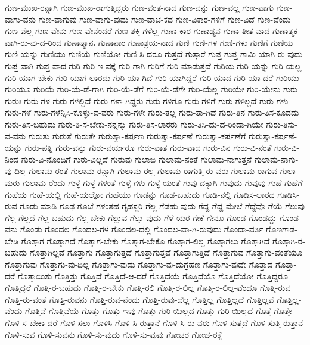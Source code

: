 {ಗುಣ-ಮುಖ-ರನ್ನಾಗಿ
ಗುಣ-ಮುಖ-ರಾಗುತ್ತಿದ್ದರು
ಗುಣ-ವಂತ-ನಾದ
ಗುಣ-ವನ್ನು
ಗುಣ-ವಲ್ಲ
ಗುಣ-ವಾಗು
ಗುಣ-ವಾಗು-ವನು
ಗುಣ-ವಾಗುವು
ಗುಣ-ವಾಗು-ವುದು
ಗುಣ-ವಾಚ-ಕದ
ಗುಣ-ವಿಕಾರ-ಗಳಿಗೆ
ಗುಣ-ವಿದೆ
ಗುಣ-ವೆಂದು
ಗುಣ-ವೆಲ್ಲ
ಗುಣ-ವೇನು
ಗುಣ-ವೇನೆಂದರೆ
ಗುಣ-ಶಕ್ತಿ-ಗಳೆಲ್ಲ
ಗುಣಾ-ಕಾರ
ಗುಣಾಢ್ಯನ
ಗುಣಾ-ತೀತ-ವಾದ
ಗುಣಾತ್ಮಕ-ವಾಗಿ-ರು-ವು-ದ-ರಿಂದ
ಗುಣಾತ್ಮಾನಃ
ಗುಣಾನಾಂ
ಗುಣಾಶ್ರಯ-ನಾದ
ಗುಣಿ
ಗುಣಿ-ಗಳ
ಗುಣಿ-ಗಳು
ಗುಣಿಗೆ
ಗುಣಿಯ
ಗುಣಿ-ಯನ್ನು
ಗುಣಿಯು
ಗುಣಿಯೆ
ಗುಣಿಯೋ
ಗುಣಿ-ಸಿ-ದರೂ
ಗುತ್ತದೆ
ಗುತ್ತಾರೆ
ಗುಪ್ತ
ಗುಪ್ತ-ಗಾಮಿ-ಯಾಗಿ-ರು-ವುದು
ಗುಪ್ತ-ವಾಗಿ
ಗುಪ್ತ-ವಾದ
ಗುರಿ
ಗುರಿ-ಇ-ವಕ್ಕೆ
ಗುರಿ-ಗಾಗಿ
ಗುರಿಗೆ
ಗುರಿ-ಮಾಡುತ್ತದೆ
ಗುರಿಯ
ಗುರಿ-ಯನ್ನು
ಗುರಿ-ಯಲ್ಲ
ಗುರಿ-ಯಾಗ-ಬೇಕು
ಗುರಿ-ಯಾಗ-ಲಾರದು
ಗುರಿ-ಯಾ-ಗಿದೆ
ಗುರಿ-ಯಾಗಿದ್ದರೆ
ಗುರಿ-ಯಾದ
ಗುರಿ-ಯಾ-ದರೆ
ಗುರಿಯು
ಗುರಿಯೂ
ಗುರಿಯೆ
ಗುರಿ-ಯೆ-ಡೆ-ಗಾಗಿ
ಗುರಿ-ಯೆ-ಡೆಗೆ
ಗುರಿ-ಯೆ-ಡೆಗೇ
ಗುರಿ-ಯೆಲ್ಲ
ಗುರಿಯೇ
ಗುರಿ-ಯೇನು
ಗುರು
ಗುರುಃ
ಗುರು-ಗಳ
ಗುರು-ಗಳಲ್ಲಿದೆ
ಗುರು-ಗಳಾ-ಗಿದ್ದರು
ಗುರು-ಗಳಿಗೂ
ಗುರು-ಗಳಿಗೆ
ಗುರು-ಗಳಿಲ್ಲದೆ
ಗುರು-ಗಳು
ಗುರು-ಗಳೆ
ಗುರು-ಗಳೆನ್ನಿಸಿ-ಕೊಳ್ಳು-ವ-ವರು
ಗುರು-ಗಳೇ
ಗುರು-ತಲ್ಲ
ಗುರು-ತಾ-ಗಿದೆ
ಗುರು-ತಿನ
ಗುರು-ತಿಸ-ಕೂಡದು
ಗುರು-ತಿಸ-ಬಹುದು
ಗುರು-ತಿ-ಸ-ಬೇಕು-ನನ್ನನ್ನು
ಗುರು-ತಿಸ-ಲಾರರು
ಗುರು-ತಿಸಿ-ದು-ದ-ರಿಂದಾ-ಗಿಯೇ
ಗುರು-ತಿಸು-ವ-ವನು
ಗುರುತು
ಗುರುತೆ
ಗುರುತೇ
ಗುರುತ್ವಾ-ಕರ್ಷಣ
ಗುರುತ್ವಾ-ಕರ್ಷಣೆ
ಗುರುತ್ವಾ-ಕರ್ಷಣೆಗೆ
ಗುರುತ್ವಾ-ಕರ್ಷಣೆ-ಯನ್ನು
ಗುರು-ಪತ್ನಿ
ಗುರು-ವನ್ನು
ಗುರು-ವರ್ಯರೂ
ಗುರು-ವಾತ
ಗುರು-ವಾದ
ಗುರು-ವಿನ
ಗುರು-ವಿ-ನಂತೆ
ಗುರು-ವಿ-ನಿಂದ
ಗುರು-ವಿ-ನೊಂದಿಗೆ
ಗುರು-ವಿಲ್ಲದೆ
ಗುರುವು
ಗುಲಾಬಿ
ಗುಲಾಮ-ನಂತೆ
ಗುಲಾಮ-ನಾಗುತ್ತನೆ
ಗುಲಾಮ-ನಾಗು-ವು-ದಿಲ್ಲ
ಗುಲಾಮ-ರಂತೆ
ಗುಲಾಮ-ರನ್ನಾಗಿ
ಗುಲಾಮ-ರಲ್ಲ
ಗುಲಾಮ-ರಾಗುತ್ತಿ-ರು-ವರು
ಗುಲಾಮ-ರಾಗುವ
ಗುಲಾ-ಮರು
ಗುಲಾಮ-ರೆಂದು
ಗುಳ್ಳೆ
ಗುಳ್ಳೆ-ಗಳಂತೆ
ಗುಳ್ಳೆ-ಗಳು
ಗುಳ್ಳೆ-ಯಂತೆ
ಗುವು-ದಕ್ಕಾಗಿ
ಗುವುದು
ಗುವುವು
ಗುಹೆ
ಗುಹೆಗೆ
ಗುಹೆಯ
ಗುಹೆ-ಯಲ್ಲಿ
ಗುಹೆ-ಯಲ್ಲೋ
ಗುಹೆಯು
ಗೂಡನ್ನು
ಗೂಡ-ಬಹುದು
ಗೂಡಿ-ನಲ್ಲಿ
ಗೂಡಿಸ-ಲಾರದ
ಗೂಡಿಸಿ-ರುವ
ಗೂಡು-ಮಾಡಿ
ಗೂಢ
ಗೂಬೆ-ಗಳಂತಹ
ಗೃಹಸ್ಥರಿ-ಗೆಲ್ಲ
ಗೆಡಹು-ವುದು
ಗೆದ್ದ
ಗೆದ್ದ-ಮೇಲೆ
ಗೆದ್ದೆವೊ
ಗೆಯೆ
ಗೆಲುವು
ಗೆಲ್ಲ
ಗೆಲ್ಲದೆ
ಗೆಲ್ಲ-ಬಹುದು
ಗೆಲ್ಲ-ಬೇಕು
ಗೆಲ್ಲುವ
ಗೆಲ್ಲು-ವುದು
ಗೆಳೆ-ಯರ
ಗೇಕೆ
ಗೇನೂ
ಗೊಂಡ
ಗೊಂಡದ್ದು
ಗೊಂಡ-ವನು
ಗೊಂಡು
ಗೊಂದಲ
ಗೊಂದಲ-ಗಳ
ಗೊಂದಲ-ದಲ್ಲಿ
ಗೊಂದಲ-ವಾ-ಗಿ-ರುವುದು
ಗೊಂದಾ-ವರ್ತಿ
ಗೊಣಗಾಡ-ಬೇಡಿ
ಗೊತ್ತಾಗ
ಗೊತ್ತಾಗದೆ
ಗೊತ್ತಾಗ-ಬೇಕು
ಗೊತ್ತಾಗ-ಬೇಕೊ
ಗೊತ್ತಾಗ-ಲಿಲ್ಲ
ಗೊತ್ತಾಗಲು
ಗೊತ್ತಾಗಿದೆ
ಗೊತ್ತಾಗಿ-ರ-ಬಹುದು
ಗೊತ್ತಾಗಿಲ್ಲವೆ
ಗೊತ್ತಾಗು
ಗೊತ್ತಾಗುತ್ತದೆ
ಗೊತ್ತಾಗುತ್ತವೆ
ಗೊತ್ತಾಗುತ್ತಿದೆ
ಗೊತ್ತಾಗುವ
ಗೊತ್ತಾಗು-ವಂತೆಯೂ
ಗೊತ್ತಾಗುವು
ಗೊತ್ತಾಗು-ವು-ದಿಲ್ಲ
ಗೊತ್ತಾಗು-ವುದು
ಗೊತ್ತಾಗು-ವು-ದುಗ್ರಹಣ
ಗೊತ್ತಾಗು-ವುದೇ
ಗೊತ್ತಾದ
ಗೊತ್ತಾ-ದರೆ
ಗೊತ್ತಾಯಿತು
ಗೊತ್ತಿತ್ತು
ಗೊತ್ತಿದೆ
ಗೊತ್ತಿದೆ-ಆ-ದರೆ
ಗೊತ್ತಿದೆಯೆ
ಗೊತ್ತಿದೆಯೊ
ಗೊತ್ತಿದೆಯೋ
ಗೊತ್ತಿದ್ದರೂ
ಗೊತ್ತಿದ್ದರೆ
ಗೊತ್ತಿ-ರ-ಬಹುದು
ಗೊತ್ತಿ-ರ-ಬೇಕು
ಗೊತ್ತಿ-ರಲಿ
ಗೊತ್ತಿ-ರ-ಲಿಲ್ಲ
ಗೊತ್ತಿ-ರ-ಲಿಲ್ಲ-ವೆಂದೂ
ಗೊತ್ತಿ-ರುವ
ಗೊತ್ತಿ-ರು-ವಂತೆ
ಗೊತ್ತಿ-ರುವನು
ಗೊತ್ತಿ-ರುವ-ನೆಂದು
ಗೊತ್ತಿ-ರುವು-ದೆಲ್ಲ
ಗೊತ್ತಿಲ್ಲ
ಗೊತ್ತಿಲ್ಲದೆ
ಗೊತ್ತಿಲ್ಲವೆ
ಗೊತ್ತಿಲ್ಲ-ವೆಂದು
ಗೊತ್ತಿವೆ
ಗೊತ್ತಿವೆಯೆ
ಗೊತ್ತು
ಗೊತ್ತು-ಇವು
ಗೊತ್ತು-ಗುರಿ-ಯಿಲ್ಲದ
ಗೊತ್ತು-ಗುರಿ-ಯಿಲ್ಲದೆ
ಗೊತ್ತೆ
ಗೊತ್ತೇ
ಗೊಳಿ-ಸ-ಬೇಕಾ-ದರೆ
ಗೊಳಿ-ಸಲು
ಗೊಳಿಸಿ
ಗೊಳಿ-ಸಿ-ರುತ್ತಾನೆ
ಗೊಳಿ-ಸಿ-ರು-ವರು
ಗೊಳಿ-ಸುತ್ತದೆ
ಗೊಳಿ-ಸುತ್ತಿ-ರುತ್ತಾನೆ
ಗೊಳಿ-ಸುವ
ಗೊಳಿ-ಸುವನು
ಗೊಳಿ-ಸು-ವುದು
ಗೊಳಿ-ಸು-ವುವು
ಗೋಚರ
ಗೋಚ-ರಕ್ಕೆ
}
